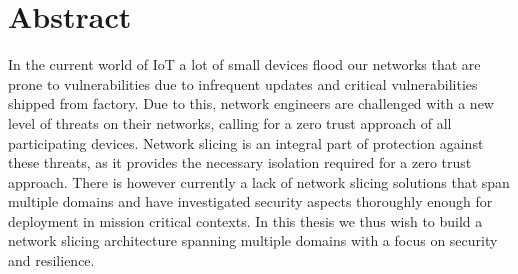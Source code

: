 \chapter*{\centering Abstract}
In the current world of IoT a lot of small devices flood our networks that are prone to vulnerabilities due to infrequent updates and critical vulnerabilities shipped from factory. Due to this, network engineers are challenged with a new level of threats on their networks, calling for a zero trust approach of all participating devices. Network slicing is an integral part of protection against these threats, as it provides the necessary isolation required for a zero trust approach. There is however currently a lack of network slicing solutions that span multiple domains and have investigated security aspects thoroughly enough for deployment in mission critical contexts. In this thesis we thus wish to build a network slicing architecture spanning multiple domains with a focus on security and resilience.